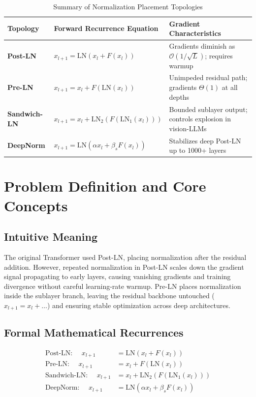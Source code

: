 \documentclass[11pt,a4paper]{article}
\theoremstyle{definition}
\begin{document}
\begin{table}[h]
\centering
\caption{Summary of Normalization Placement Topologies}
\begin{tabular}{lll}
\toprule
\textbf{Topology} & \textbf{Forward Recurrence Equation} & \textbf{Gradient Characteristics} \\
\midrule
\textbf{Post-LN} & $x_{l+1} = \text{LN}(x_l + F(x_l))$ & Gradients diminish as $\mathcal{O}(1/\sqrt{L})$; requires warmup \\
\textbf{Pre-LN} & $x_{l+1} = x_l + F(\text{LN}(x_l))$ & Unimpeded residual path; gradients $\Theta(1)$ at all depths \\
\textbf{Sandwich-LN} & $x_{l+1} = x_l + \text{LN}_2(F(\text{LN}_1(x_l)))$ & Bounded sublayer output; controls explosion in vision-LLMs \\
\textbf{DeepNorm} & $x_{l+1} = \text{LN}(\alpha x_l + \beta_s F(x_l))$ & Stabilizes deep Post-LN up to 1000+ layers \\
\bottomrule
\end{tabular}
\end{table}

\section{Problem Definition and Core Concepts}

\subsection{Intuitive Meaning}
The original Transformer used Post-LN, placing normalization after the residual addition. However, repeated normalization in Post-LN scales down the gradient signal propagating to early layers, causing vanishing gradients and training divergence without careful learning-rate warmup. Pre-LN places normalization inside the sublayer branch, leaving the residual backbone untouched ($x_{l+1} = x_l + \dots$) and ensuring stable optimization across deep architectures.

\subsection{Formal Mathematical Recurrences}
\begin{align}
\text{Post-LN: } \quad x_{l+1} &= \text{LN}(x_l + F(x_l)) \\
\text{Pre-LN: } \quad x_{l+1} &= x_l + F(\text{LN}(x_l)) \\
\text{Sandwich-LN: } \quad x_{l+1} &= x_l + \text{LN}_2(F(\text{LN}_1(x_l))) \\
\text{DeepNorm: } \quad x_{l+1} &= \text{LN}(\alpha x_l + \beta_s F(x_l))
\end{align}
\end{document}
